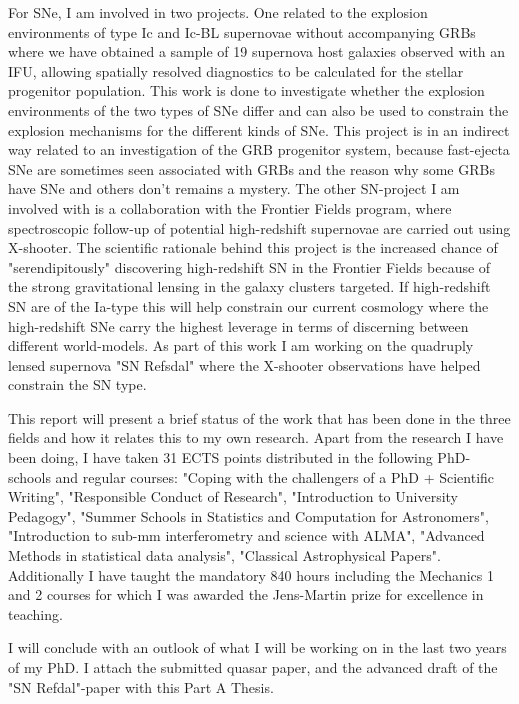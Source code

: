 For SNe, I am involved in two projects. One related to the explosion
environments of type Ic and Ic-BL supernovae without accompanying GRBs where we
have obtained a sample of 19 supernova host galaxies observed with an IFU,
allowing spatially resolved diagnostics to be calculated for the stellar
progenitor population. This work is done to investigate whether the explosion
environments of the
two types of SNe differ and can also be used to constrain
the explosion
mechanisms for the different kinds of SNe. This project is in an
indirect way
related to an investigation of the GRB progenitor system, because
fast-ejecta
SNe are sometimes seen associated with GRBs and the reason why some
GRBs have
SNe and others don't remains a mystery. The other SN-project I am
involved with is a collaboration with the Frontier Fields program, where
spectroscopic follow-up of potential high-redshift supernovae are carried out
using X-shooter. The scientific rationale behind this project is the increased
chance of "serendipitously" discovering high-redshift SN in the Frontier Fields
because of the strong gravitational lensing in the galaxy clusters targeted. If
high-redshift SN are of the Ia-type this will help constrain our current
cosmology where the high-redshift SNe carry the highest leverage in terms of
discerning between different world-models. As part of this work I am working on
the quadruply lensed supernova "SN Refsdal" where the X-shooter observations
have helped constrain the SN type.

This report will present a brief status of the work that has been done in the
three fields and how it relates this to my own research. Apart from the research
I have been doing, I have taken 31 ECTS points distributed in the following
PhD-schools and regular courses: "Coping with the challengers of a PhD +
Scientific Writing", "Responsible Conduct of Research", "Introduction to
University Pedagogy", "Summer Schools in Statistics and Computation for
Astronomers", "Introduction to sub-mm interferometry and science with ALMA",
"Advanced Methods in statistical data analysis", "Classical Astrophysical
Papers". Additionally I have taught the mandatory 840 hours including the
Mechanics 1 and 2
courses for which I was awarded the Jens-Martin prize for
excellence in
teaching.

I will conclude with an outlook of what I will be working on in the last two
years of my PhD. 
I attach the submitted quasar paper, and the advanced draft of
the "SN Refdal"-paper with this Part A Thesis.



